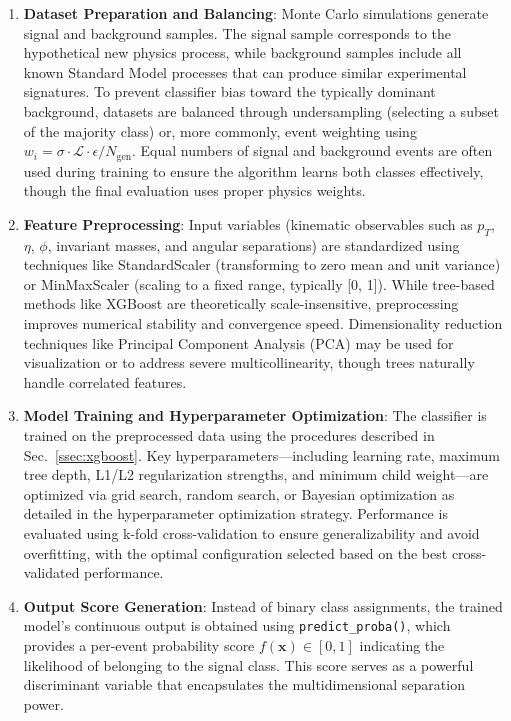 \begin{enumerate}
    \item \textbf{Dataset Preparation and Balancing}: Monte Carlo simulations generate signal and background samples. The signal sample corresponds to the hypothetical new physics process, while background samples include all known Standard Model processes that can produce similar experimental signatures. To prevent classifier bias toward the typically dominant background, datasets are balanced through undersampling (selecting a subset of the majority class) or, more commonly, event weighting using $w_i = \sigma \cdot \mathcal{L} \cdot \epsilon / N_{\text{gen}}$. Equal numbers of signal and background events are often used during training to ensure the algorithm learns both classes effectively, though the final evaluation uses proper physics weights.
    
    \item \textbf{Feature Preprocessing}: Input variables (kinematic observables such as $p_T$, $\eta$, $\phi$, invariant masses, and angular separations) are standardized using techniques like StandardScaler (transforming to zero mean and unit variance) or MinMaxScaler (scaling to a fixed range, typically [0, 1]). While tree-based methods like XGBoost are theoretically scale-insensitive, preprocessing improves numerical stability and convergence speed. Dimensionality reduction techniques like Principal Component Analysis (PCA) may be used for visualization or to address severe multicollinearity, though trees naturally handle correlated features.
    
    \item \textbf{Model Training and Hyperparameter Optimization}: The classifier is trained on the preprocessed data using the procedures described in Sec.~\ref{ssec:xgboost}. Key hyperparameters—including learning rate, maximum tree depth, L1/L2 regularization strengths, and minimum child weight—are optimized via grid search, random search, or Bayesian optimization as detailed in the hyperparameter optimization strategy. Performance is evaluated using k-fold cross-validation to ensure generalizability and avoid overfitting, with the optimal configuration selected based on the best cross-validated performance.
    
    \item \textbf{Output Score Generation}: Instead of binary class assignments, the trained model's continuous output is obtained using \texttt{predict\_proba()}, which provides a per-event probability score $f(\mathbf{x}) \in [0, 1]$ indicating the likelihood of belonging to the signal class. This score serves as a powerful discriminant variable that encapsulates the multidimensional separation power.
    

\end{enumerate}
